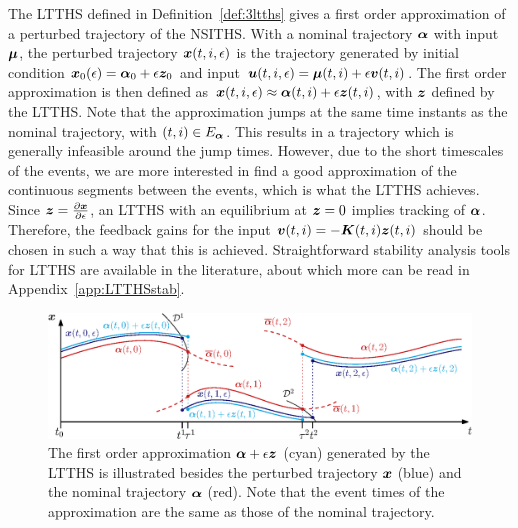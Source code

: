 \documentclass[../DC2017114Bouma.tex]{subfiles}
\begin{document}
The LTTHS defined in Definition~\ref{def:3ltths} gives a first order approximation of a perturbed trajectory of the NSITHS. With a nominal trajectory $\boldsymbol{\alpha}$ with input $\boldsymbol{\mu}$, the perturbed trajectory ${\boldsymbol{x}}(t,i,\epsilon)$ is the trajectory generated by initial condition ${\boldsymbol{x}}_0(\epsilon) = \boldsymbol{\alpha}_0 + \epsilon{\boldsymbol{z}}_0$ and input ${\boldsymbol{u}}(t,i,\epsilon) = \boldsymbol{\mu}(t,i) + \epsilon{\boldsymbol{v}}(t,i)$. The first order approximation is then defined as ${\boldsymbol{x}}(t,i,\epsilon) \approx \boldsymbol{\alpha}(t,i) + \epsilon{\boldsymbol{z}}(t,i)$, with ${\boldsymbol{z}}$ defined by the LTTHS. Note that the approximation jumps at the same time instants as the nominal trajectory, with $(t,i) \in E_{\boldsymbol{\alpha}}$. This results in a trajectory which is generally infeasible around the jump times. However, due to the short timescales of the events, we are more interested in find a good approximation of the continuous segments between the events, which is what the LTTHS achieves. Since ${\boldsymbol{z}} = \frac{\partial{\boldsymbol{x}}}{\partial\epsilon}$, an LTTHS with an equilibrium at ${\boldsymbol{z}} = 0$ implies tracking of $\boldsymbol{\alpha}$. Therefore, the feedback gains for the input ${\boldsymbol{v}}(t,i) = -{\boldsymbol{K}}(t,i){\boldsymbol{z}}(t,i)$ should be chosen in such a way that this is achieved. Straightforward stability analysis tools for LTTHS are available in the literature, about which more can be read in Appendix~\ref{app:LTTHSstab}.

\begin{figure}[h]
\centering
\includegraphics[width=.95\textwidth]{refspreadapprox.eps}\caption{The first order approximation $\boldsymbol{\alpha} + \epsilon{\boldsymbol{z}}$ (cyan) generated by the LTTHS is illustrated besides the perturbed trajectory ${\boldsymbol{x}}$ (blue) and the nominal trajectory $\boldsymbol{\alpha}$ (red). Note that the event times of the approximation are the same as those of the nominal trajectory.} \label{fig:3refspreadapprox}
\end{figure}
\end{document}
